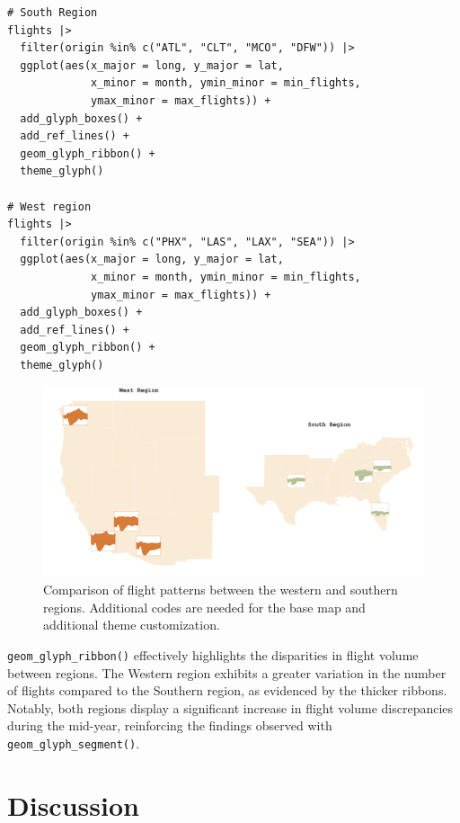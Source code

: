\begin{verbatim}
# South Region
flights |> 
  filter(origin %in% c("ATL", "CLT", "MCO", "DFW")) |>
  ggplot(aes(x_major = long, y_major = lat,
             x_minor = month, ymin_minor = min_flights,
             ymax_minor = max_flights)) + 
  add_glyph_boxes() +
  add_ref_lines() +
  geom_glyph_ribbon() +
  theme_glyph()

# West region
flights |> 
  filter(origin %in% c("PHX", "LAS", "LAX", "SEA")) |>
  ggplot(aes(x_major = long, y_major = lat,
             x_minor = month, ymin_minor = min_flights,
             ymax_minor = max_flights)) + 
  add_glyph_boxes() +
  add_ref_lines() +
  geom_glyph_ribbon() +
  theme_glyph()
\end{verbatim}

\begin{figure}
\includegraphics[width=50in]{figures/west_south} \caption{Comparison of flight patterns between the western and southern regions. Additional codes are needed for the base map and additional theme customization.}\label{fig:unnamed-chunk-27}
\end{figure}

\texttt{geom\_glyph\_ribbon()} effectively highlights the disparities in flight volume between regions. The Western region exhibits a greater variation in the number of flights compared to the Southern region, as evidenced by the thicker ribbons. Notably, both regions display a significant increase in flight volume discrepancies during the mid-year, reinforcing the findings observed with \texttt{geom\_glyph\_segment()}.

\section{Discussion}\label{discussion}

